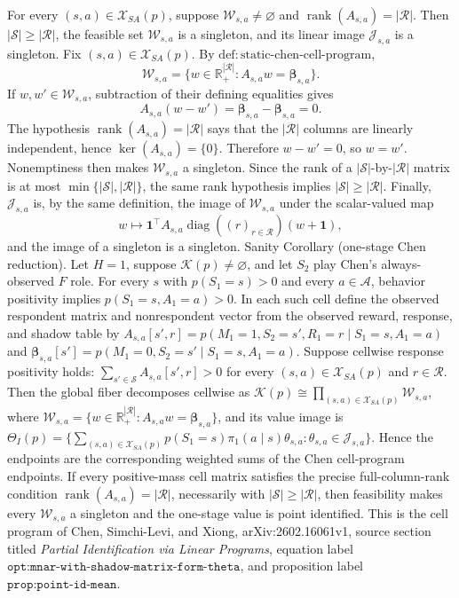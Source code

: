 For every \((s,a)\in\mathcal X_{SA}(p)\), suppose \(\mathcal W_{s,a}\ne\varnothing\) and \(\operatorname{rank}(A_{s,a})=|\mathcal R|\). Then \(|\mathcal S|\ge |\mathcal R|\), the feasible set \(\mathcal W_{s,a}\) is a singleton, and its linear image \(\mathcal J_{s,a}\) is a singleton.
Fix \((s,a)\in\mathcal X_{SA}(p)\). By \(\mathrm{def{:}static\text{-}chen\text{-}cell\text{-}program}\),
\[
\mathcal W_{s,a}=\{w\in\mathbb R_+^{|\mathcal R|}:A_{s,a}w=\boldsymbol\beta_{s,a}\}.
\]
If \(w,w'\in\mathcal W_{s,a}\), subtraction of their defining equalities gives
\[
A_{s,a}(w-w')=\boldsymbol\beta_{s,a}-\boldsymbol\beta_{s,a}=0.
\]
The hypothesis \(\operatorname{rank}(A_{s,a})=|\mathcal R|\) says that the \(|\mathcal R|\) columns are linearly independent, hence \(\ker(A_{s,a})=\{0\}\). Therefore \(w-w'=0\), so \(w=w'\). Nonemptiness then makes \(\mathcal W_{s,a}\) a singleton. Since the rank of a \(|\mathcal S|\)-by-\(|\mathcal R|\) matrix is at most \(\min\{|\mathcal S|,|\mathcal R|\}\), the same rank hypothesis implies \(|\mathcal S|\ge |\mathcal R|\). Finally, \(\mathcal J_{s,a}\) is, by the same definition, the image of \(\mathcal W_{s,a}\) under the scalar-valued map
\[
w\longmapsto \mathbf 1^\top A_{s,a}\operatorname{diag}((r)_{r\in\mathcal R})(w+\mathbf 1),
\]
and the image of a singleton is a singleton.
Sanity Corollary (one-stage Chen reduction). Let \(H=1\), suppose \(\mathcal K(p)\ne\varnothing\), and let \(S_2\) play Chen's always-observed \(F\) role. For every \(s\) with \(p(S_1=s)>0\) and every \(a\in\mathcal A\), behavior positivity implies \(p(S_1=s,A_1=a)>0\). In each such cell define the observed respondent matrix and nonrespondent vector from the observed reward, response, and shadow table by \(A_{s,a}[s',r]=p(M_1=1,S_2=s',R_1=r\mid S_1=s,A_1=a)\) and \(\boldsymbol\beta_{s,a}[s']=p(M_1=0,S_2=s'\mid S_1=s,A_1=a)\). Suppose cellwise response positivity holds: \(\sum_{s'\in\mathcal S}A_{s,a}[s',r]>0\) for every \((s,a)\in\mathcal X_{SA}(p)\) and \(r\in\mathcal R\). Then the global fiber decomposes cellwise as \(\mathcal K(p)\cong\prod_{(s,a)\in\mathcal X_{SA}(p)}\mathcal W_{s,a}\), where \(\mathcal W_{s,a}=\{w\in\mathbb R_+^{|\mathcal R|}:A_{s,a}w=\boldsymbol\beta_{s,a}\}\), and its value image is \(\Theta_I(p)=\{\sum_{(s,a)\in\mathcal X_{SA}(p)}p(S_1=s)\pi_1(a\mid s)\theta_{s,a}:\theta_{s,a}\in\mathcal J_{s,a}\}\). Hence the endpoints are the corresponding weighted sums of the Chen cell-program endpoints. If every positive-mass cell matrix satisfies the precise full-column-rank condition \(\operatorname{rank}(A_{s,a})=|\mathcal R|\), necessarily with \(|\mathcal S|\ge|\mathcal R|\), then feasibility makes every \(\mathcal W_{s,a}\) a singleton and the one-stage value is point identified. This is the cell program of Chen, Simchi-Levi, and Xiong, arXiv:2602.16061v1, source section titled \emph{Partial Identification via Linear Programs}, equation label \(\texttt{opt:mnar-with-shadow-matrix-form-theta}\), and proposition label \(\texttt{prop:point-id-mean}\).
